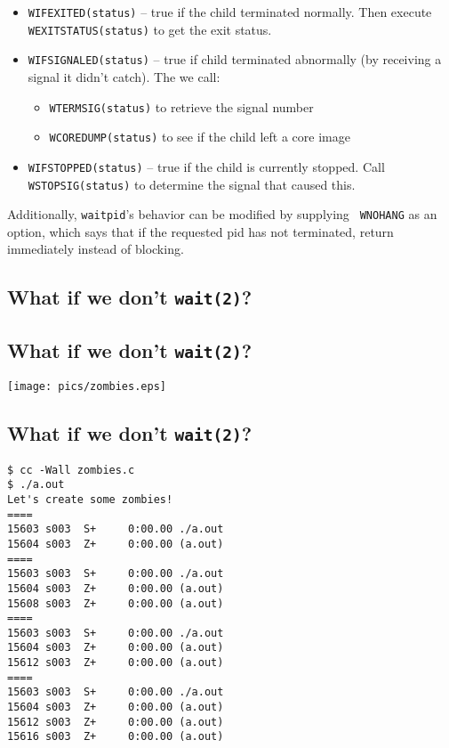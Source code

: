 \documentclass[xga]{xdvislides}
\begin{document}
\begin{itemize}
	\item {\tt WIFEXITED(status)} -- true if the child terminated normally.
		Then execute {\tt WEXITSTATUS(status)} to get the exit status.
	\item {\tt WIFSIGNALED(status)} -- true if child terminated abnormally
		(by receiving a signal it didn't catch). The we call:
		\begin{itemize}
			\item {\tt WTERMSIG(status)} to retrieve the signal number
			\item {\tt WCOREDUMP(status)} to see if the child left a core image
		\end{itemize}
	\item {\tt WIFSTOPPED(status)} -- true if the child is currently stopped.
		Call {\tt WSTOPSIG(status)} to determine the signal that caused this.
\end{itemize}

Additionally, {\tt waitpid}'s behavior can be modified by supplying {\tt
WNOHANG} as an option, which says that if the requested pid has not
terminated, return immediately instead of blocking.

\subsection{What if we don't {\tt wait(2)}?}

\subsection{What if we don't {\tt wait(2)}?}
\vspace*{\fill}
\begin{center}
	\texttt{[image: pics/zombies.eps]}
\end{center}
\vspace*{\fill}

\subsection{What if we don't {\tt wait(2)}?}
\smallish
\begin{verbatim}
$ cc -Wall zombies.c
$ ./a.out
Let's create some zombies!
====
15603 s003  S+     0:00.00 ./a.out
15604 s003  Z+     0:00.00 (a.out)
====
15603 s003  S+     0:00.00 ./a.out
15604 s003  Z+     0:00.00 (a.out)
15608 s003  Z+     0:00.00 (a.out)
====
15603 s003  S+     0:00.00 ./a.out
15604 s003  Z+     0:00.00 (a.out)
15612 s003  Z+     0:00.00 (a.out)
====
15603 s003  S+     0:00.00 ./a.out
15604 s003  Z+     0:00.00 (a.out)
15612 s003  Z+     0:00.00 (a.out)
15616 s003  Z+     0:00.00 (a.out)

\end{verbatim}
\end{document}
